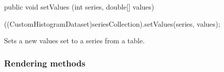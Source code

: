 \begin{code}

   public void setValues (int series, double[] values) \begin{hide} {
      ((CustomHistogramDataset)seriesCollection).setValues(series, values);
   }\end{hide}
\end{code}
\begin{tabb}
   Sets a new values set to a series from a table.
\end{tabb}
\begin{htmlonly}
\end{htmlonly}


\newpage

\subsubsection*{Rendering methods}

